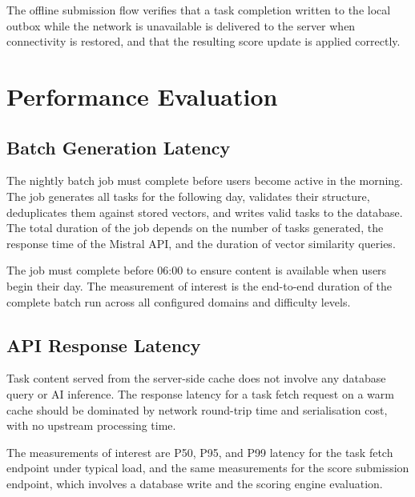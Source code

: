 The offline submission flow verifies that a task completion written to the local outbox while the network is unavailable is delivered to the server when connectivity is restored, and that the resulting score update is applied correctly.


\section{Performance Evaluation}

\subsection{Batch Generation Latency}

The nightly batch job must complete before users become active in the morning. The job generates all tasks for the following day, validates their structure, deduplicates them against stored vectors, and writes valid tasks to the database. The total duration of the job depends on the number of tasks generated, the response time of the Mistral API, and the duration of vector similarity queries.

The job must complete before 06:00 to ensure content is available when users begin their day. The measurement of interest is the end-to-end duration of the complete batch run across all configured domains and difficulty levels.


\subsection{API Response Latency}

Task content served from the server-side cache does not involve any database query or AI inference. The response latency for a task fetch request on a warm cache should be dominated by network round-trip time and serialisation cost, with no upstream processing time.

The measurements of interest are P50, P95, and P99 latency for the task fetch endpoint under typical load, and the same measurements for the score submission endpoint, which involves a database write and the scoring engine evaluation.

